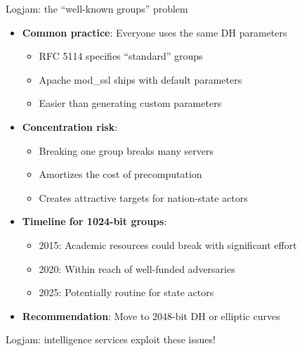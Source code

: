 \ifdefined\PRESENTATION\else\PassOptionsToClass{handout}{beamer}\fi\documentclass[aspectratio=169, lualatex]{beamer}
\begin{document}
\begin{frame}{Logjam: the ``well-known groups'' problem}
	\begin{itemize}
		\item \textbf{Common practice}: Everyone uses the same DH parameters
		      \begin{itemize}
			      \item RFC 5114 specifies ``standard'' groups
			      \item Apache mod\_ssl ships with default parameters
			      \item Easier than generating custom parameters
		      \end{itemize}
		\item \textbf{Concentration risk}:
		      \begin{itemize}
			      \item Breaking one group breaks many servers
			      \item Amortizes the cost of precomputation
			      \item Creates attractive targets for nation-state actors
		      \end{itemize}
		\item \textbf{Timeline for 1024-bit groups}:
		      \begin{itemize}
			      \item 2015: Academic resources could break with significant effort
			      \item 2020: Within reach of well-funded adversaries
			      \item 2025: Potentially routine for state actors
		      \end{itemize}
		\item \textbf{Recommendation}: Move to 2048-bit DH or elliptic curves
	\end{itemize}
\end{frame}

\begin{frame}{Logjam: intelligence services exploit these issues!}
\end{frame}
\end{document}
